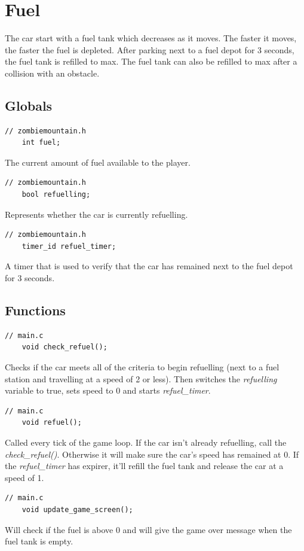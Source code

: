 \documentclass{article}
\begin{document}
\section{Fuel}
The car start with a fuel tank which decreases as it moves. The faster it moves, the faster the fuel is depleted. After parking next to a fuel depot for 3 seconds, the fuel tank is refilled to max. The fuel tank can also be refilled to max after a collision with an obstacle. 

\subsection*{Globals}
\begin{lstlisting}[style=CStyle]
	// zombiemountain.h
	int fuel;
\end{lstlisting}
The current amount of fuel available to the player.
\begin{lstlisting}[style=CStyle]
	// zombiemountain.h
	bool refuelling;
\end{lstlisting}
Represents whether the car is currently refuelling.
\begin{lstlisting}[style=CStyle]
	// zombiemountain.h
	timer_id refuel_timer;
\end{lstlisting}
A timer that is used to verify that the car has remained next to the fuel depot for 3 seconds.
\newline

\subsection*{Functions}
\begin{lstlisting}[style=CStyle]
	// main.c
	void check_refuel();
\end{lstlisting}
Checks if the car meets all of the criteria to begin refuelling (next to a fuel station and travelling at a speed of 2 or less). Then switches the \emph{refuelling} variable to true, sets speed to 0 and starts \emph{refuel\_timer}.
\begin{lstlisting}[style=CStyle]
	// main.c
	void refuel();
\end{lstlisting}
Called every tick of the game loop. If the car isn't already refuelling, call the \emph{check\_refuel()}. Otherwise it will make sure the car's speed has remained at 0. If the \emph{refuel\_timer} has expirer, it'll refill the fuel tank and release the car at a speed of 1.
\begin{lstlisting}[style=CStyle]
	// main.c
	void update_game_screen();
\end{lstlisting}
Will check if the fuel is above 0 and will give the game over message when the fuel tank is empty.
\end{document}
